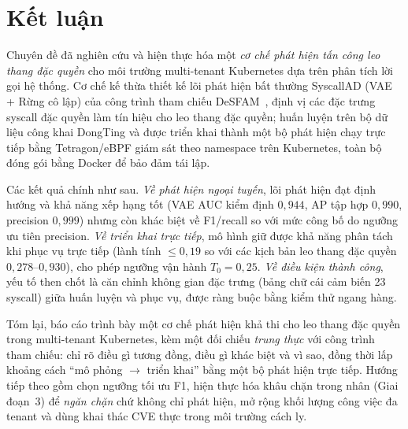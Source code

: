 \section{Kết luận}
\label{sec:conclusion}

Chuyên đề đã nghiên cứu và hiện thực hóa một \emph{cơ chế phát hiện tấn công leo
thang đặc quyền} cho môi trường multi-tenant Kubernetes dựa trên phân tích lời gọi
hệ thống. Cơ chế kế thừa thiết kế lõi phát hiện bất thường SyscallAD (VAE + Rừng cô
lập) của công trình tham chiếu DeSFAM~\cite{desfam_original}, định vị các đặc trưng
syscall đặc quyền làm tín hiệu cho leo thang đặc quyền; huấn luyện trên bộ dữ liệu
công khai DongTing và được triển khai thành một bộ phát hiện chạy trực tiếp bằng
Tetragon/eBPF giám sát theo namespace trên Kubernetes, toàn bộ đóng gói bằng Docker
để bảo đảm tái lập.

Các kết quả chính như sau. \emph{Về phát hiện ngoại tuyến}, lõi phát hiện đạt định
hướng và khả năng xếp hạng tốt (VAE AUC kiểm định $0{,}944$, AP tập hợp $0{,}990$,
precision $0{,}999$) nhưng còn khác biệt về F1/recall so với mức công bố do ngưỡng
ưu tiên precision. \emph{Về triển khai trực tiếp}, mô hình giữ được khả năng phân
tách khi phục vụ trực tiếp (lành tính $\le 0{,}19$ so với các kịch bản leo thang
đặc quyền $0{,}278$--$0{,}930$), cho phép ngưỡng vận hành $T_0=0{,}25$. \emph{Về
điều kiện thành công}, yếu tố then chốt là căn chỉnh không gian đặc trưng (bảng chữ
cái cảm biến 23 syscall) giữa huấn luyện và phục vụ, được ràng buộc bằng kiểm thử
ngang hàng.

Tóm lại, báo cáo trình bày một cơ chế phát hiện khả thi cho leo thang đặc quyền
trong multi-tenant Kubernetes, kèm một đối chiếu \emph{trung thực} với công trình
tham chiếu: chỉ rõ điều gì tương đồng, điều gì khác biệt và vì sao, đồng thời
lấp khoảng cách ``mô phỏng $\to$ triển khai'' bằng một bộ phát hiện trực tiếp. Hướng
tiếp theo gồm chọn ngưỡng tối ưu F1, hiện thực hóa khâu chặn trong nhân (Giai đoạn~3)
để \emph{ngăn chặn} chứ không chỉ phát hiện, mở rộng khối lượng công việc đa tenant
và dùng khai thác CVE thực trong môi trường cách ly.
